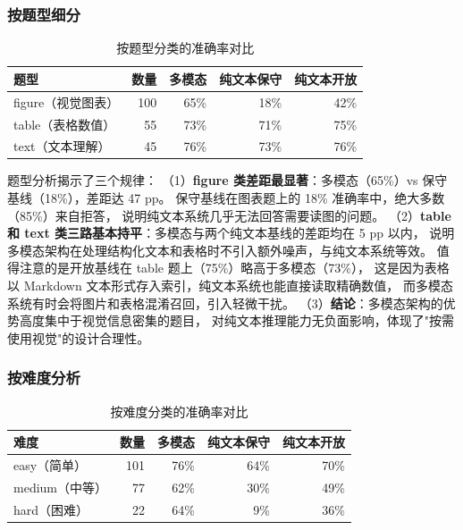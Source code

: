 ﻿\documentclass[UTF8, heading=true]{ctexart}
\begin{document}
\subsubsection{按题型细分}

\begin{table}[H]
\centering
\caption{按题型分类的准确率对比}
\begin{tabular}{lrrrr}
\toprule
\textbf{题型} & \textbf{数量} & \textbf{多模态} & \textbf{纯文本保守} & \textbf{纯文本开放} \\
\midrule
figure（视觉图表）& 100 & 65\% & 18\% & 42\% \\
table（表格数值）& 55 & 73\% & 71\% & 75\% \\
text（文本理解）& 45 & 76\% & 73\% & 76\% \\
\bottomrule
\end{tabular}
\label{tab:bytype}
\end{table}

题型分析揭示了三个规律：
（1）\textbf{figure 类差距最显著}：多模态（65\%）vs 保守基线（18\%），差距达 47 pp。
保守基线在图表题上的 18\% 准确率中，绝大多数（85\%）来自拒答，
说明纯文本系统几乎无法回答需要读图的问题。
（2）\textbf{table 和 text 类三路基本持平}：多模态与两个纯文本基线的差距均在 5 pp 以内，
说明多模态架构在处理结构化文本和表格时不引入额外噪声，与纯文本系统等效。
值得注意的是开放基线在 table 题上（75\%）略高于多模态（73\%），
这是因为表格以 Markdown 文本形式存入索引，纯文本系统也能直接读取精确数值，
而多模态系统有时会将图片和表格混淆召回，引入轻微干扰。
（3）\textbf{结论}：多模态架构的优势高度集中于视觉信息密集的题目，
对纯文本推理能力无负面影响，体现了"按需使用视觉"的设计合理性。

\subsubsection{按难度分析}

\begin{table}[H]
\centering
\caption{按难度分类的准确率对比}
\begin{tabular}{lrrrr}
\toprule
\textbf{难度} & \textbf{数量} & \textbf{多模态} & \textbf{纯文本保守} & \textbf{纯文本开放} \\
\midrule
easy（简单）& 101 & 76\% & 64\% & 70\% \\
medium（中等）& 77 & 62\% & 30\% & 49\% \\
hard（困难）& 22 & 64\% & 9\% & 36\% \\
\bottomrule
\end{tabular}
\label{tab:bydiff}
\end{table}
\end{document}
